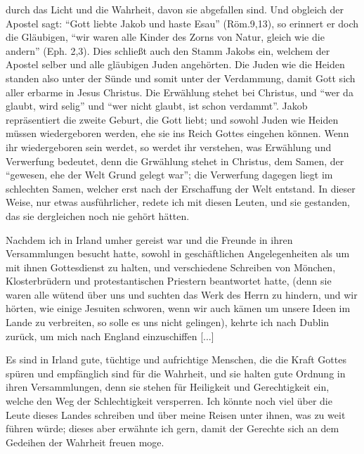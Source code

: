 durch das Licht und die Wahrheit, davon sie abgefallen sind.
Und obgleich der Apostel sagt: "`Gott liebte Jakob und haste
Esau"' (Röm.9,13), so erinnert er 
doch die Gläubigen, "`wir waren alle Kinder des Zorns von 
Natur, gleich wie die andern"' (Eph. 2,3).
Dies schließt auch den Stamm Jakobs ein, welchem der Apostel
selber und alle gläubigen Juden angehörten. Die Juden wie die
Heiden standen also unter der Sünde und somit 
unter der Verdammung, damit Gott sich aller erbarme in Jesus Christus.
Die Erwählung stehet bei Christus, und "`wer da glaubt, wird
selig"' und "`wer nicht glaubt, ist schon verdammt"'. Jakob 
repräsentiert die zweite Geburt, die Gott liebt; und sowohl Juden
wie Heiden müssen wiedergeboren werden, 
ehe sie ins Reich Gottes eingehen können. Wenn ihr wiedergeboren 
sein werdet, so werdet
ihr verstehen, was Erwählung und Verwerfung bedeutet, denn
die Grwählung stehet in Christus, dem Samen, der "`gewesen,
ehe der Welt Grund gelegt war"'; die Verwerfung dagegen liegt
im schlechten Samen, welcher erst nach der Erschaffung der Welt
entstand. In dieser Weise, nur etwas ausführlicher, redete ich
mit diesen Leuten, und sie gestanden, das sie dergleichen noch
nie gehört hätten.

Nachdem ich in Irland umher gereist war und die Freunde
in ihren Versammlungen besucht hatte, sowohl in geschäftlichen
Angelegenheiten als um mit ihnen Gottesdienst zu halten, und
verschiedene Schreiben von Mönchen, Klosterbrüdern und 
protestantischen Priestern beantwortet hatte, 
(denn sie waren alle wütend über uns und suchten das Werk des Herrn zu hindern,
und wir hörten, wie einige Jesuiten schworen, wenn wir auch
kämen um unsere Ideen im Lande zu verbreiten, so solle es uns
nicht gelingen), kehrte ich nach Dublin zurück, um mich nach England
einzuschiffen [...]

Es sind in Irland gute, tüchtige und aufrichtige Menschen,
die die Kraft Gottes spüren und empfänglich sind für die 
Wahrheit, und sie halten gute Ordnung in ihren Versammlungen,
denn sie stehen für Heiligkeit und Gerechtigkeit ein, welche den
Weg der Schlechtigkeit versperren. Ich könnte noch viel über
die Leute dieses Landes schreiben und über meine Reisen unter
ihnen, was zu weit führen würde; dieses aber erwähnte ich gern,
damit der Gerechte sich an dem Gedeihen der Wahrheit freuen
moge.

